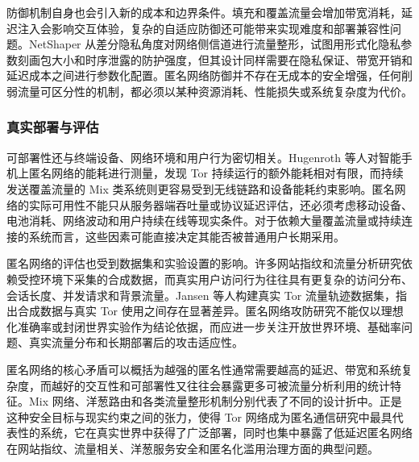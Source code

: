 防御机制自身也会引入新的成本和边界条件。填充和覆盖流量会增加带宽消耗，延迟注入会影响交互体验，复杂的自适应防御还可能带来实现难度和部署兼容性问题。NetShaper 从差分隐私角度对网络侧信道进行流量整形，试图用形式化隐私参数刻画包大小和时序泄露的防护强度，但其设计同样需要在隐私保证、带宽开销和延迟成本之间进行参数化配置\cite{sabzi2024netshaper}。匿名网络防御并不存在无成本的安全增强，任何削弱流量可区分性的机制，都必须以某种资源消耗、性能损失或系统复杂度为代价。

\subsubsection{真实部署与评估}

可部署性还与终端设备、网络环境和用户行为密切相关。Hugenroth 等人对智能手机上匿名网络的能耗进行测量，发现 Tor 持续运行的额外能耗相对有限，而持续发送覆盖流量的 Mix 类系统则更容易受到无线链路和设备能耗约束影响\cite{hugenroth2023powering}。匿名网络的实际可用性不能只从服务器端吞吐量或协议延迟评估，还必须考虑移动设备、电池消耗、网络波动和用户持续在线等现实条件。对于依赖大量覆盖流量或持续连接的系统而言，这些因素可能直接决定其能否被普通用户长期采用。

匿名网络的评估也受到数据集和实验设置的影响。许多网站指纹和流量分析研究依赖受控环境下采集的合成数据，而真实用户访问行为往往具有更复杂的访问分布、会话长度、并发请求和背景流量。Jansen 等人构建真实 Tor 流量轨迹数据集，指出合成数据与真实 Tor 使用之间存在显著差异\cite{jansen2026measurement}。匿名网络攻防研究不能仅以理想化准确率或封闭世界实验作为结论依据，而应进一步关注开放世界环境、基础率问题、真实流量分布和长期部署后的攻击适应性。

匿名网络的核心矛盾可以概括为越强的匿名性通常需要越高的延迟、带宽和系统复杂度，而越好的交互性和可部署性又往往会暴露更多可被流量分析利用的统计特征。Mix 网络、洋葱路由和各类流量整形机制分别代表了不同的设计折中。正是这种安全目标与现实约束之间的张力，使得 Tor 网络成为匿名通信研究中最具代表性的系统，它在真实世界中获得了广泛部署，同时也集中暴露了低延迟匿名网络在网站指纹、流量相关、洋葱服务安全和匿名化滥用治理方面的典型问题。
